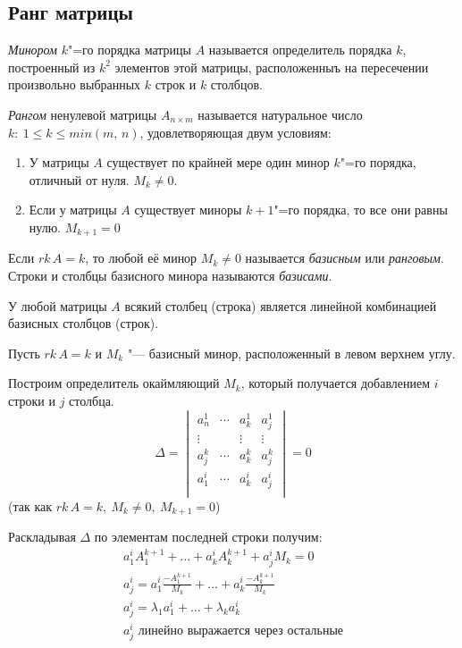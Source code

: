 \subsection*{Ранг матрицы}

\begin{definition}
  \textit{Минором} $k$"=го порядка матрицы $A$ называется определитель порядка $k$, построенный из $k^2$ элементов этой матрицы, расположенныъ на пересечении произвольно выбранных $k$ строк и $k$ столбцов.
\end{definition}
\begin{definition}
  \textit{Рангом} ненулевой  матрицы $A_{n\times m}$ называется натуральное число $k:~ 1 \leq k \leq min(m,\, n)$, удовлетворяющая двум условиям:
  \begin{enumerate}
    \item У матрицы $A$ существует по крайней мере один минор $k$"=го порядка, отличный от нуля. $M_k \neq 0$.
    \item Если у матрицы $A$ существует миноры $k+1$"=го порядка, то все они равны нулю. $M_{k+1} = 0$
  \end{enumerate}
\end{definition}

\begin{definition}
  Если $rk\,A = k$, то любой её минор $M_k \neq 0$ называется \textit{базисным} или \textit{ранговым}. Строки и столбцы базисного минора называются \textit{базисами}.
\end{definition}
\begin{theorem}
  У любой матрицы $A$ всякий столбец (строка) является линейной комбинацией базисных столбцов (строк).
\end{theorem}
\begin{Proof}
  Пусть $rk\,A = k$ и $M_k$ "--- базисный минор, расположенный в левом верхнем углу.

  Построим определитель окаймляющий $M_k$, который получается добавлением $i$ строки и $j$ столбца.
  \begin{equation*}
    \Delta = \begin{vmatrix}
      a_n^1 & \cdots & a_k^1 &  a_j^1 \\
      \vdots && \vdots & \vdots \\
      a_j^k & \cdots & a_k^k  & a_j^k \\
      a_1^i & \cdots & a_k^i & a_j^i \\
    \end{vmatrix} = 0
  \end{equation*}
  (так как $rk\,A = k,~ M_k \neq 0, ~M_{k + 1} = 0$)

  Раскладывая $\Delta$ по элементам последней строки получим:
  \begin{gather*}
    a_1^i A_1^{k+1} + \ldots + a_k^i A_k^{k + 1} + a_j^i M_k = 0 \\
    a_j^i = a_1^i \frac{-A_1^{k + 1}}{M_k} + \ldots + a_k^i \frac{-A_k^{k + 1}}{M_k} \\
    a_j^i = \lambda_1 a_1^i + \ldots + \lambda_k a_k^i \\
    a_j^i \text{ линейно выражается через остальные}
  \end{gather*}
\end{Proof}

